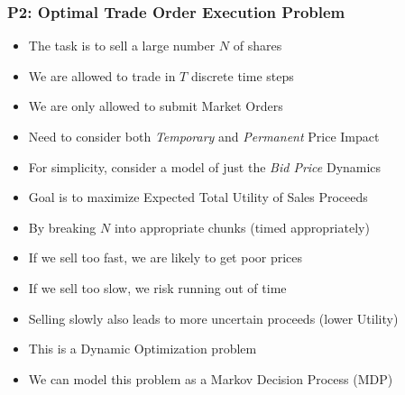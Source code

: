 \documentclass[handout]{beamer}
\begin{document}
\begin{frame}
\frametitle{P2: Optimal Trade Order Execution Problem}
\pause
\begin{itemize}[<+->]
\item The task is to sell a large number $N$ of shares
\item We are allowed to trade in $T$ discrete time steps
\item We are only allowed to submit Market Orders
\item Need to consider both {\em Temporary} and {\em Permanent} Price Impact
\item For simplicity, consider a model of just the {\em Bid Price} Dynamics
\item Goal is to maximize Expected Total Utility of Sales Proceeds
\item By breaking $N$ into appropriate chunks (timed appropriately)
\item If we sell too fast, we are likely to get poor prices
\item If we sell too slow, we risk running out of time
\item Selling slowly also leads to more uncertain proceeds (lower Utility)
\item This is a Dynamic Optimization problem
\item We can model this problem as a Markov Decision Process (MDP)
\end{itemize}
\end{frame}
\end{document}
